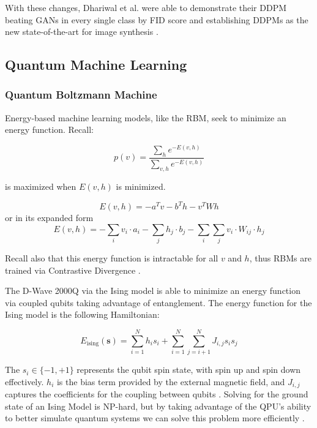 \documentclass[%
 reprint,
 amsmath,amssymb,
 aps,
]{revtex4-2}
\begin{document}
With these changes, Dhariwal et al. were able to demonstrate their DDPM beating GANs in every single class by FID score and establishing DDPMs as the new state-of-the-art for image synthesis  \cite{dhariwal2021diffusion}.

\subsection{Quantum Machine Learning}
\subsubsection{Quantum Boltzmann Machine}
Energy-based machine learning models, like the RBM, seek to minimize an energy function. Recall:

\begin{equation}
p(v) = \frac{\sum_{h} e^{-E(v,h)}}{\sum_{v,h}e^{-E(v,h)}}
\end{equation}


is maximized when $E(v,h)$ is minimized.

\begin{equation}
E(v, h) = -a^Tv -b^Th -v^TWh
\end{equation}
or in its expanded form
\begin{equation}
E(v, h) = - \sum_{i} v_i \cdot a_i - \sum_{j} h_j \cdot b_j - \sum_{i} \sum_{j} v_i \cdot W_{ij} \cdot h_j
\end{equation}

Recall also that this energy function is intractable for all $v$ and $h$, thus RBMs are trained via Contrastive Divergence \cite{trainingrbms}.

The D-Wave 2000Q via the Ising model is able to minimize an energy function via coupled qubits taking advantage of entanglement. The energy function for the Ising model is the following Hamiltonian:

\begin{equation}
E_{\text{ising}}(\mathbf{s}) = \sum_{i=1}^N h_i s_i + \sum_{i=1}^N \sum_{j=i+1}^N J_{i,j} s_i s_j
\end{equation}



The $s_i \in \{-1, +1\}$ represents the qubit spin state, with spin up and spin down effectively. $h_i$ is the bias term provided by the external magnetic field, and $J_{i,j}$ captures the coefficients for the coupling between qubits \cite{dwavedocs}. Solving for the ground state of an Ising Model is NP-hard, but by taking advantage of the QPU's ability to better simulate quantum systems we can solve this problem more efficiently \cite{monte}.
\end{document}
